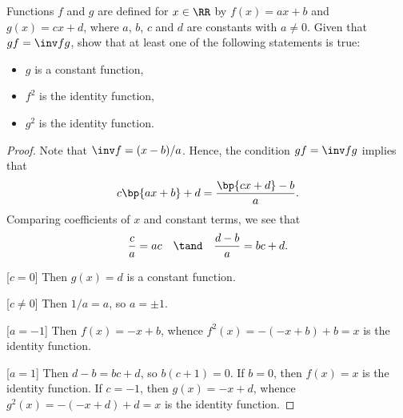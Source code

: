 \begin{problem}
    Functions $f$ and $g$ are defined for $x \in \RR$ by $f(x) = ax + b$ and $g(x) = cx + d$, where $a$, $b$, $c$ and $d$ are constants with $a \neq 0$. Given that $gf = \inv f g$, show that at least one of the following statements is true:
    \begin{itemize}
        \item $g$ is a constant function,
        \item $f^2$ is the identity function,
        \item $g^2$ is the identity function.
    \end{itemize}
\end{problem}
\begin{proof}
    Note that $\inv f = (x-b)/a$. Hence, the condition $gf = \inv fg$ implies that \[c\bp{ax + b} + d = \frac{\bp{cx + d} -b}{a}.\] Comparing coefficients of $x$ and constant terms, we see that \[\frac{c}{a} = ac \quad \tand \quad \frac{d-b}{a} = bc + d.\]

    [$c = 0$] Then $g(x) = d$ is a constant function.

    [$c \neq 0$] Then $1/a = a$, so $a = \pm 1$.

    [$a = -1$] Then $f(x) = -x + b$, whence $f^2(x) = -(-x+b)+b = x$ is the identity function.

    [$a = 1$] Then $d - b = bc + d$, so $b(c+1) = 0$. If $b = 0$, then $f(x) = x$ is the identity function. If $c = -1$, then $g(x) = -x+d$, whence $g^2(x) = -(-x+d)+d = x$ is the identity function.
\end{proof}

